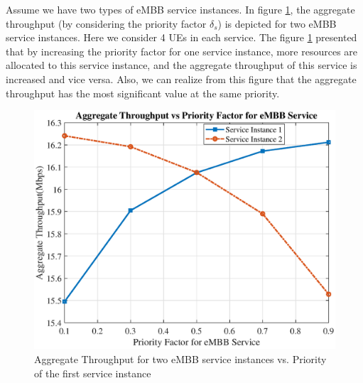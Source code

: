 \documentclass[conference]{IEEEtran}
\begin{document}
Assume we have two types of eMBB service instances. In figure \ref{fig:9}, the aggregate throughput (by considering the priority factor $\delta_s$) is depicted for two eMBB service instances. Here we consider 4 UEs in each service. The figure \ref{fig:9} presented that by increasing the priority factor for one service instance, more resources are allocated to this service instance, and the aggregate throughput of this service is increased and vice versa. Also, we can realize from this figure that the aggregate throughput has the most significant value at the same priority.
\begin{figure}
  \centering 
    \includegraphics[scale = 0.4]{priorityLast.eps}
  \caption{Aggregate Throughput for two eMBB service instances vs. Priority of the first service instance }
  \label{fig:9}
\end{figure}
\end{document}
